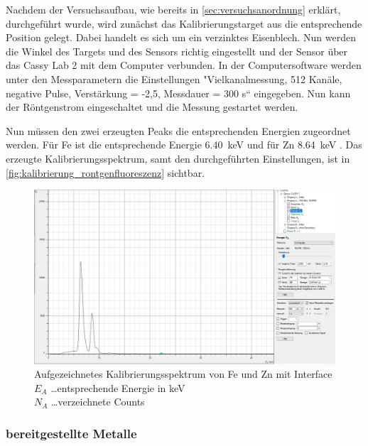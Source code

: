 \documentclass[12pt,english,ngerman]{scrartcl}
\begin{document}
Nachdem der Versuchsaufbau, wie bereits in \autoref{sec:versuchsanordnung} erklärt, durchgeführt wurde,
wird zunächst das Kalibrierungstarget aus die entsprechende Position gelegt. Dabei handelt es sich um 
ein verzinktes Eisenblech. Nun werden die Winkel des Targets und des Sensors richtig eingestellt und der
Sensor über das Cassy Lab 2 mit dem Computer verbunden.
In der Computersoftware werden unter den Messparametern die Einstellungen 
"Vielkanalmessung, 512 Kanäle, negative Pulse, Verstärkung = -2,5, Messdauer = 300 s“
eingegeben. Nun kann der Röntgenstrom eingeschaltet und die Messung gestartet werden.

Nun müssen den zwei erzeugten Peaks die entsprechenden Energien zugeordnet werden. 
Für Fe ist die entsprechende Energie \SI{6.40}{keV} und für Zn \SI{8.64}{keV} \cite{unterlagen_rontgenfluorenzenz}.
Das erzeugte Kalibrierungsspektrum, samt den durchgeführten Einstellungen, ist in \autoref{fig:kalibrierung_rontgenfluoreszenz} sichtbar.

\begin{figure}[H]
	\begin{center}
		\includegraphics[width =\textwidth]{./figures/roentgen/FeZnKalibrierung.PNG}
	\end{center}
	\caption[Aufgezeichnetes Kalibrierungsspektrum mit Interface]
	{\footnotesize Aufgezeichnetes Kalibrierungsspektrum von Fe und Zn mit Interface \\
	$E_A$ \dots entsprechende Energie in keV\\
	$N_A$ \dots verzeichnete Counts
	}\label{fig:kalibrierung_rontgenfluoreszenz}
\end{figure}


\subsubsection{bereitgestellte Metalle}
\end{document}
